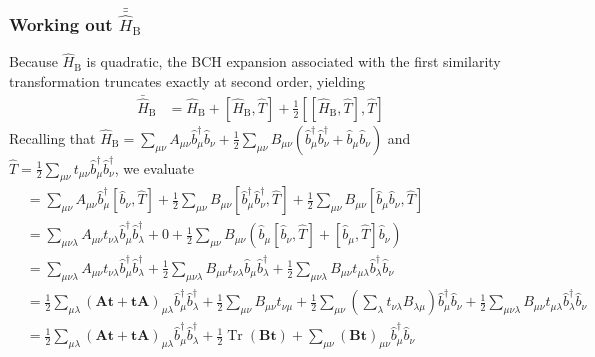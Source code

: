 \subsubsection{Working out $\bar{\bar{\hat{H}}}_{\mathrm{B}}$}
Because $\hat{H}_{\mathrm{B}}$ is quadratic, the BCH expansion associated with the first similarity transformation truncates exactly at second order, yielding
\begin{align}
	\bar{\hat{H}}_{\mathrm{B}} 
	& = \hat{H}_{\mathrm{B}} + [\hat{H}_{\mathrm{B}}, \hat{T}] + \frac{1}{2} [[\hat{H}_{\mathrm{B}}, \hat{T}], \hat{T}]
\end{align}
Recalling that $\hat{H}_{\mathrm{B}} = \sum_{\mu\nu} A_{\mu\nu} \hat{b}^\dagger_{\mu} \hat{b}_{\nu} + \frac{1}{2} \sum_{\mu\nu} B_{\mu\nu} \left( \hat{b}^\dagger_{\mu} \hat{b}^\dagger_{\nu} + \hat{b}_{\mu} \hat{b}_{\nu} \right)$ and $\hat{T} = \frac{1}{2} \sum_{\mu\nu} t_{\mu\nu} \hat{b}^\dagger_{\mu} \hat{b}^\dagger_{\nu}$,
 we evaluate
\begin{align}
	[\hat{H}_{\mathrm{B}}, \hat{T}] 
	& = \sum_{\mu\nu} A_{\mu\nu} \hat{b}^\dagger_\mu [\hat{b}_\nu, \hat{T}] + \frac{1}{2} \sum_{\mu\nu} B_{\mu\nu} [\hat{b}^\dagger_\mu \hat{b}^\dagger_\nu, \hat{T}] + \frac{1}{2} \sum_{\mu\nu} B_{\mu\nu} [\hat{b}_\mu \hat{b}_\nu, \hat{T}] \\
	& = \sum_{\mu\nu\lambda} A_{\mu\nu} t_{\nu\lambda} \hat{b}^\dagger_\mu \hat{b}^\dagger_\lambda + 0+\frac{1}{2} \sum_{\mu\nu} B_{\mu\nu} ( \hat{b}_\mu [\hat{b}_\nu, \hat{T}] + [\hat{b}_\mu, \hat{T}] \hat{b}_\nu ) \\
	& = \sum_{\mu\nu\lambda} A_{\mu\nu} t_{\nu\lambda} \hat{b}^\dagger_\mu \hat{b}^\dagger_\lambda +\frac{1}{2} \sum_{\mu\nu\lambda} B_{\mu\nu} t_{\nu\lambda} \hat{b}_\mu \hat{b}^\dagger_\lambda + \frac{1}{2} \sum_{\mu\nu\lambda} B_{\mu\nu} t_{\mu\lambda} \hat{b}^\dagger_\lambda \hat{b}_\nu \\
	& = \frac{1}{2} \sum_{\mu\lambda} (\mathbf{At} + \mathbf{tA})_{\mu\lambda} \hat{b}^\dagger_\mu \hat{b}^\dagger_\lambda + \frac{1}{2} \sum_{\mu\nu} B_{\mu\nu} t_{\nu\mu} + \frac{1}{2}\sum_{\mu\nu} (\sum_\lambda t_{\nu\lambda} B_{\lambda\mu}) \hat{b}^\dagger_\mu \hat{b}_\nu +  \frac{1}{2} \sum_{\mu\nu\lambda} B_{\mu\nu} t_{\mu\lambda} \hat{b}^\dagger_\lambda \hat{b}_\nu \\
	& = \frac{1}{2} \sum_{\mu\lambda} (\mathbf{At} + \mathbf{tA})_{\mu\lambda} \hat{b}^\dagger_\mu \hat{b}^\dagger_\lambda + \frac{1}{2} \operatorname{Tr}(\mathbf{Bt}) + \sum_{\mu\nu} (\mathbf{Bt})_{\mu\nu} \hat{b}^\dagger_\mu \hat{b}_\nu
\end{align}
